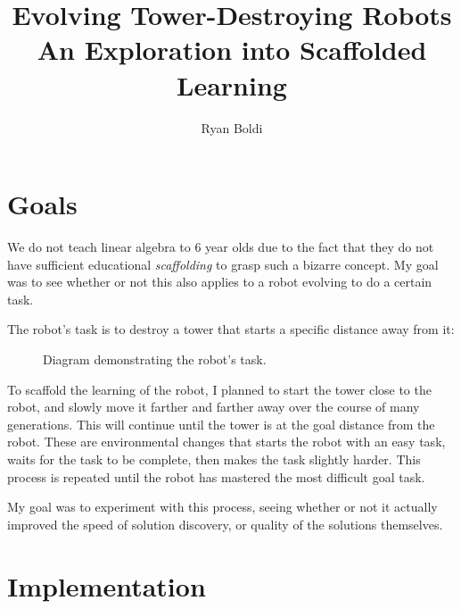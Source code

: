 \documentclass[12pt, a4paper]{article}
\title{Evolving Tower-Destroying Robots\\\normalsize An Exploration into Scaffolded Learning}
\author{Ryan Boldi}
\begin{document}
\maketitle
\tableofcontents
\newpage
\section{Goals}
We do not teach linear algebra to 6 year olds due to the fact that they do not have sufficient educational \emph{scaffolding} to grasp such a bizarre concept. My goal was to see whether or not this also applies to a robot evolving to do a certain task.\par 
The robot's task is to destroy a tower that starts a specific distance away from it:\par
\vspace{-10pt}
\begin{figure}[h]
	\label{goal}
\begin{center}
	\centering
{}
\caption{Diagram demonstrating the robot's task.}
\end{center}
\end{figure}
\vspace{-10pt}
To scaffold the learning of the robot, I planned to start the tower close to the robot, and slowly move it farther and farther away over the course of many generations. This will continue until the tower is at the goal distance from the robot. These are environmental changes that starts the robot with an easy task, waits for the task to be complete, then makes the task slightly harder. This process is repeated until the robot has mastered the most difficult goal task.\par
My goal was to experiment with this process, seeing whether or not it actually improved the speed of solution discovery, or quality of the solutions themselves.
\newpage

\section{Implementation}
\end{document}
